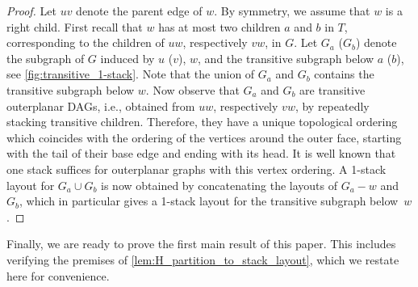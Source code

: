 \documentclass{theoretics}
\begin{document}
\begin{proof}
    Let $ uv $ denote the parent edge of $ w $.
    By symmetry, we assume that $ w $ is a right child.
    First recall that $ w $ has at most two children $ a $ and $ b $ in $ T $, corresponding to the children of $ uw $, respectively $ vw $, in $ G $.
    Let $ G_a $ ($ G_b$) denote the subgraph of $ G $ induced by $ u $ ($ v $), $ w $, and the transitive subgraph below $ a $ ($ b $), see \cref{fig:transitive_1-stack}.
    Note that the union of $ G_a $ and $ G_b $ contains the transitive subgraph below $ w $.
    Now observe that $ G_a $ and $ G_b $ are transitive outerplanar DAGs, i.e., obtained from $ uw $, respectively $ vw $, by repeatedly stacking transitive children.
    Therefore, they have a unique topological ordering which coincides with the ordering of the vertices around the outer face, starting with the tail of their base edge and ending with its head.
    It is well known that one stack suffices for outerplanar graphs with this vertex ordering.
    A 1-stack layout for $ G_a \cup G_b $ is now obtained by concatenating the layouts of $ G_a - w $ and $ G_b $, which in particular gives a 1-stack layout for the transitive subgraph below~$ w $.
\end{proof}

\medskip

Finally, we are ready to prove the first main result of this paper.
This includes verifying the premises of \cref{lem:H_partition_to_stack_layout}, which we restate here for convenience.

\HPartitionToStackLayout*

\outerplanarBounded*
\end{document}
